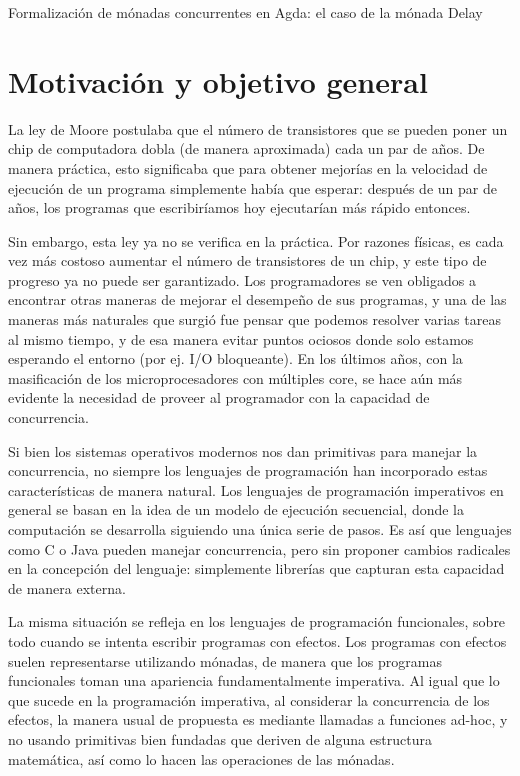 \documentclass[11pt,a4paper]{article}
\begin{document}
Formalización de mónadas concurrentes en Agda: el caso de la mónada Delay

\section{Motivación y objetivo general}

La ley de Moore postulaba que el número de transistores que se pueden
poner un chip de computadora dobla (de manera aproximada) cada un par
de años. De manera práctica, esto significaba que para obtener
mejorías en la velocidad de ejecución de un programa simplemente había
que esperar: después de un par de años, los programas que escribiríamos
hoy ejecutarían más rápido entonces.

Sin embargo, esta ley ya no se verifica en la práctica. Por razones
físicas, es cada vez más costoso aumentar el número de transistores de
un chip, y este tipo de progreso ya no puede ser garantizado. Los
programadores se ven obligados a encontrar otras maneras de mejorar el
desempeño de sus programas, y una de las maneras más naturales que
surgió fue pensar que podemos resolver varias tareas al mismo tiempo,
y de esa manera evitar puntos ociosos donde solo estamos esperando el
entorno (por ej. I/O bloqueante). En los últimos años, con la
masificación de los microprocesadores con múltiples core, se hace aún
más evidente la necesidad de proveer al programador con la capacidad
de concurrencia.

Si bien los sistemas operativos modernos nos dan primitivas para
manejar la concurrencia, no siempre los lenguajes de programación han
incorporado estas características de manera natural. Los lenguajes de
programación imperativos en general se basan en la idea de un modelo
de ejecución secuencial, donde la computación se desarrolla siguiendo
una única serie de pasos. Es así que lenguajes como C o Java pueden
manejar concurrencia, pero sin proponer cambios radicales en la
concepción del lenguaje: simplemente librerías que capturan esta
capacidad de manera externa.

La misma situación se refleja en los lenguajes de programación
funcionales, sobre todo cuando se intenta escribir programas con
efectos. Los programas con efectos suelen representarse utilizando
mónadas, de manera que los programas funcionales toman una apariencia
fundamentalmente imperativa. Al igual que lo que sucede en la
programación imperativa, al considerar la concurrencia de los efectos, la
manera usual de propuesta es mediante llamadas a funciones ad-hoc, y
no usando primitivas bien fundadas que deriven de alguna estructura
matemática, así como lo hacen las operaciones de las mónadas.
\end{document}
